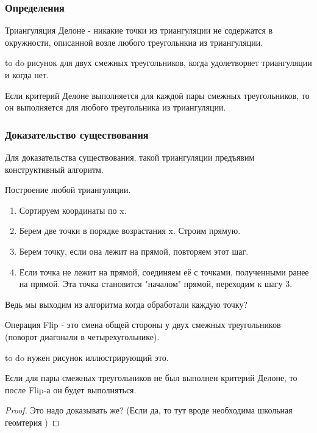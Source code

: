 \subsubsection[title]{Определения}
\begin{definition} 
Триангуляция Делоне - никакие точки из триангуляции не содержатся в окружности, описанной возле любого треугольнкиа из триангуляции.
\end{definition}

to do рисунок для двух смежных треугольников, когда удолетворяет триангуляции и когда нет.

\begin{statement}
Если критерий Делоне выполняется для каждой пары смежных треугольников, то он выполняется для любого треугольника из триангуляции. 
\end{statement}

\subsubsection[title]{Доказательство существования}
Для доказательства существования, такой триангуляции предъявим конструктивный алгоритм. 
\begin{algorithm}
Построение любой триангуляции.
\begin{enumerate}
	\item Сортируем координаты по x. 
	\item Берем две точки в порядке возрастания x. Строим прямую.
	\item Берем точку, если она лежит на прямой, повторяем этот шаг.
	\item Если точка не лежит на прямой, соединяем её с точками, полученными ранее на прямой. Эта точка становится "началом" 
		прямой, переходим к шагу 3. 
\end{enumerate}
Ведь мы выходим из алгоритма когда обработали каждую точку? 
\end{algorithm}

\begin{definition} 
Операция Flip - это смена общей стороны у двух смежных треугольников (поворот диагонали в четырехугольнике). 
\end{definition}
to do нужен рисунок иллюстрирующий это. 

\begin{statement}
Если для пары смежных треугольников не был выполнен критерий Делоне, то после Flip-а он будет выполняться.
\begin{proof} 
Это надо доказывать же? (Если да, то тут вроде необходима школьная геомтерия )
\end{proof}
\end{statement}

